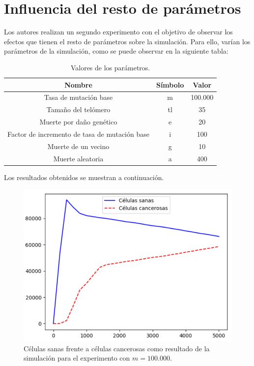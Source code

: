 \section{Influencia del resto de parámetros}

Los autores realizan un segundo experimento con el objetivo de observar los efectos
que tienen el resto de parámetros sobre la simulación. Para ello, varían los parámetros de
la simulación, como se puede observar en la siguiente tabla:

\begin{table}[h!]
  \centering
  \caption{Valores de los parámetros.}
  \label{tab:table1}
  \begin{tabular}{ccc}
    \toprule
    Nombre & Símbolo & Valor\\
    \midrule
    Tasa de mutación base & m & 100.000\\
    Tamaño del telómero & tl & 35\\
    Muerte por daño genético & e & 20\\
    Factor de incremento de tasa de mutación base & i & 100\\
    Muerte de un vecino & g & 10\\
    Muerte aleatoria & a & 400\\
    \bottomrule
  \end{tabular}
\end{table}

Los resultados obtenidos se muestran a continuación.

\begin{figure}[h]
\centering
\includegraphics[scale=0.8]{figures/experiments/exp4/healthvscarcino}
\caption{Células sanas frente a células cancerosas como resultado de la simulación para el experimento con $m = 100.000$.}
\end{figure}

